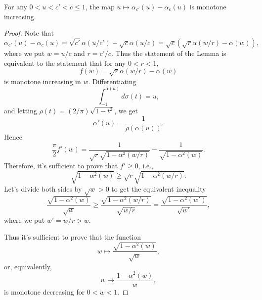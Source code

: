 \begin{lemma} \label{lem:dIsMonotone}
    For any $0<u<c'<c\leq 1$, the map $u\mapsto  \alpha_{c'}(u) - \alpha_c(u) $ is monotone increasing.
\end{lemma}
\begin{proof}
Note that $$\alpha_{c'}(u)-\alpha_c(u) = \sqrt{c'}\alpha(u/c') - \sqrt{c}\alpha(u/c) = \sqrt{c}\left(\sqrt{r}\alpha\left(w/r\right)  -\alpha(w)\right),$$ where we put $w=u/c$ and $r=c'/c$. Thus the statement of the Lemma is equivalent to the statement that for any $0<r<1$,  $$f(w) = 
\sqrt{r} \alpha(w/r) - \alpha(w)$$ is monotone increasing in $w$.
Differentiating $$\int_{-1}^{\alpha(u)} d\sigma(t) = u,$$ and letting $\rho(t)=(2/\pi)\sqrt{1-t^2}$, we get  $$
\alpha'(u) = \frac{1}{\rho(\alpha(u))}.$$ Hence
$$\frac{\pi}{2} f'(w) =\frac{1}{\sqrt{r}\sqrt{1-\alpha^2(w/r)}} - \frac{1}{\sqrt{1-\alpha^2(w)}}.$$ Therefore, it's sufficient to prove that $f'\geq 0$, i.e., $$
\sqrt{1-\alpha^2(w)} \geq \sqrt{r}\sqrt{1-\alpha^2(w/r)}.
$$
Let's divide both sides by $\sqrt{w}>0$ to get the equivalent inequality
$$
\frac{\sqrt{1-\alpha^2(w)}}{\sqrt{w}} \geq 
\frac{\sqrt{1-\alpha^2(w/r)}}{\sqrt{w/r}} = \frac{\sqrt{1-\alpha^2(w')}}{\sqrt{w'}},
$$ where we put $w'=w/r>w$.

Thus it's sufficient to prove that the function $$w\mapsto\frac{\sqrt{1-\alpha^2(w)}}{\sqrt{w}},$$ or, equivalently,
$$w\mapsto \frac{1-\alpha^2(w)}{w},$$ is monotone decreasing for $0<w<1$. 


\end{proof}

